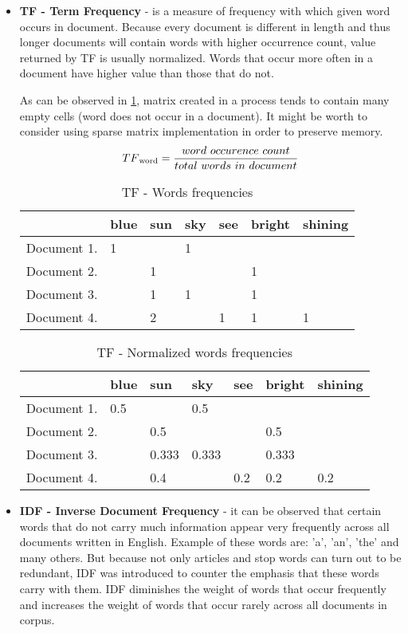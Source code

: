\begin{itemize}
	\item \textbf{TF - Term Frequency} - is a measure of frequency with which given word occurs in document. Because every document is different in length and thus longer documents will contain words with higher occurrence count, value returned by TF is usually normalized. Words that occur more often in a document have higher value than those that do not.
	
	As can be observed in \ref{tf_idf_tf_freq}, matrix created in a process tends to contain many empty cells (word does not occur in a document). It might be worth to consider using sparse matrix implementation in order to preserve memory.
	\[TF\textsubscript{word}=\frac{word\ occurence\ count}{total\ words\ in\ document}\]	
\begin{table}[H]	
	\centering
	\caption{TF - Words frequencies}
	\label{tf_idf_tf_freq}
\begin{tabular}{@{}lllllll@{}}
	\toprule
	& blue & sun & sky & see & bright & shining \\ \midrule
	Document 1. & 1    &     & 1   &     &        &         \\
	Document 2. &      & 1   &     &     & 1      &         \\
	Document 3. &      & 1   & 1   &     & 1      &         \\
	Document 4. &      & 2   &     & 1   & 1      & 1       \\ \bottomrule
\end{tabular}
\end{table}
\begin{table}[H]
	\centering
	\caption{TF - Normalized words frequencies}
	\label{tf_idf_tf_norm_freq}
\begin{tabular}{@{}lllllll@{}}
	\toprule
	& blue & sun & sky & see & bright & shining \\ \midrule
	Document 1. & 0.5    &     & 0.5   &     &        &         \\
	Document 2. &      & 0.5   &     &     & 0.5      &         \\
	Document 3. &      & 0.333   & 0.333   &     & 0.333      &         \\
	Document 4. &      & 0.4   &     & 0.2   & 0.2      & 0.2       \\ \bottomrule
\end{tabular}
\end{table}
	
	\item \textbf{IDF - Inverse Document Frequency} - it can be observed that certain words that do not carry much information appear very frequently across all documents written in English. Example of these words are: 'a', 'an', 'the' and many others. But because not only articles and stop words can turn out to be redundant, IDF was introduced to counter the emphasis that these words carry with them. IDF diminishes the weight of words that occur frequently and increases the weight of words that occur rarely across all documents in corpus.


\end{itemize}
